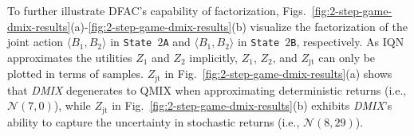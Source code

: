 \documentclass{article}
\newcommand{\utility}{Z}
\newcommand{\joint}{\mathrm{jt}}
\newcommand{\dmix}{\textit{DMIX}}
\begin{document}
To further illustrate DFAC's capability of factorization, Figs.~\ref{fig:2-step-game-dmix-results}(a)-\ref{fig:2-step-game-dmix-results}(b) visualize the factorization of the joint action $\langle B_1,B_2\rangle$ in \texttt{State $2$A} and $\langle B_1,B_2\rangle$ in \texttt{State $2$B}, respectively.
As IQN approximates the utilities $\utility{}_1$ and $\utility{}_2$ implicitly,  $\utility{}_1$, $\utility{}_2$, and $\utility{}_{\joint{}}$ can only be plotted in terms of samples. $\utility{}_{\joint{}}$ in Fig.~\ref{fig:2-step-game-dmix-results}(a) shows that \dmix{} degenerates to QMIX when approximating deterministic returns (i.e., $\mathcal{N}(7,0)$), while $\utility{}_{\joint{}}$ in Fig.~\ref{fig:2-step-game-dmix-results}(b) exhibits \dmix{}'s ability to capture the uncertainty in stochastic returns (i.e., $\mathcal{N}(8,29)$).
\end{document}
